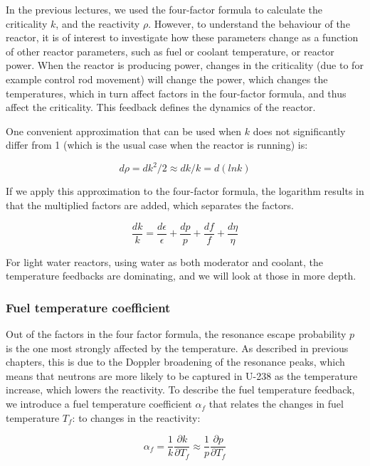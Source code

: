 In the previous lectures, we used the four-factor formula to calculate the criticality $k$, and the reactivity $\rho$. However, to understand the behaviour of the reactor, it is of interest to investigate how these parameters change as a function of other reactor parameters, such as fuel or coolant temperature, or reactor power. When the reactor is producing power, changes in the criticality (due to for example control rod movement) will change the power, which changes the temperatures, which in turn affect factors in the four-factor formula, and thus affect the criticality. This feedback defines the dynamics of the reactor.

One convenient approximation that can be used when $k$ does not significantly differ from 1 (which is the usual case when the reactor is running) is:

\begin{equation} \label{eq:dk_approx}
d\rho = dk^2/2 \approx dk/k = d(ln k)
\end{equation} 

If we apply this approximation to the four-factor formula, the logarithm results in that the multiplied factors are added, which separates the factors.

\begin{equation} \label{eq:dk_dk}
\frac{dk}{k} = \frac{d\epsilon}{\epsilon} + \frac{dp}{p} + \frac{df}{f} + \frac{d\eta}{\eta}
\end{equation} 

For light water reactors, using water as both moderator and coolant, the temperature feedbacks are dominating, and we will look at those in more depth.

\subsubsection{Fuel temperature coefficient}
Out of the factors in the four factor formula, the resonance escape probability $p$ is the one most strongly affected by the temperature. As described in previous chapters, this is due to the Doppler broadening of the resonance peaks, which means that neutrons are more likely to be captured in U-238 as the temperature increase, which lowers the reactivity. To describe the fuel temperature feedback, we introduce a fuel temperature coefficient $\alpha_f$ that relates the changes in fuel temperature $T_f$: to changes in the reactivity:

\begin{equation} \label{eq:alpha_f}
\alpha_f = \frac{1}{k}\frac{\partial k }{\partial T_f} \approx \frac{1}{p}\frac{\partial p}{\partial T_f}
\end{equation} 

